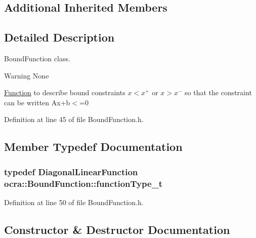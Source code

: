 \subsection*{Additional Inherited Members}


\subsection{Detailed Description}
Bound\+Function class. 

\begin{DoxyWarning}{Warning}
None
\end{DoxyWarning}
\hyperlink{classocra_1_1Function}{Function} to describe bound constraints $ x<x^+ $ or $ x>x^- $ so that the constraint can be written Ax+b$<$=0 

Definition at line 45 of file Bound\+Function.\+h.



\subsection{Member Typedef Documentation}
\subsubsection[{\texorpdfstring{function\+Type\+\_\+t}{functionType_t}}]{\setlength{\rightskip}{0pt plus 5cm}typedef {\bf Diagonal\+Linear\+Function} {\bf ocra\+::\+Bound\+Function\+::function\+Type\+\_\+t}}\hypertarget{classocra_1_1BoundFunction_acba2ac4d2f6caf04054590615a41ac21}{}\label{classocra_1_1BoundFunction_acba2ac4d2f6caf04054590615a41ac21}


Definition at line 50 of file Bound\+Function.\+h.



\subsection{Constructor \& Destructor Documentation}
